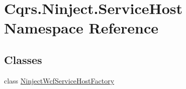 \hypertarget{namespaceCqrs_1_1Ninject_1_1ServiceHost}{}\section{Cqrs.\+Ninject.\+Service\+Host Namespace Reference}
\label{namespaceCqrs_1_1Ninject_1_1ServiceHost}
\subsection*{Classes}
\begin{DoxyCompactItemize}
\item 
class \hyperlink{classCqrs_1_1Ninject_1_1ServiceHost_1_1NinjectWcfServiceHostFactory}{Ninject\+Wcf\+Service\+Host\+Factory}
\end{DoxyCompactItemize}
